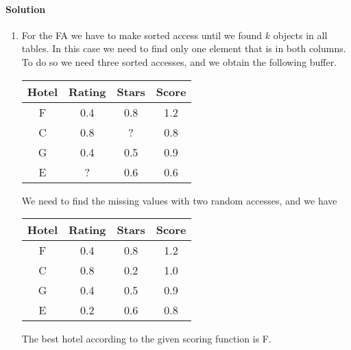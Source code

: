 \paragraph*{Solution}
\begin{enumerate}
    \item For the FA we have to make sorted access until we found $k$ objects in all tables. 
        In this case we need to find only one element that is in both columns. To do so we need 
        three sorted accesses, and we obtain the following buffer. 
        \begin{table}[H]
            \centering
            \begin{tabular}{c|cc|c}
            \hline
            \textbf{Hotel} & \textbf{Rating} & \textbf{Stars} & \textbf{Score} \\ \hline
            F     & 0.4    & 0.8   & 1.2   \\
            C     & 0.8    & ?     & 0.8   \\
            G     & 0.4    & 0.5   & 0.9   \\
            E     & ?      & 0.6   & 0.6   \\ \hline
            \end{tabular}
        \end{table}
        We need to find the missing values with two random accesses, and we have
        \begin{table}[H]
            \centering
            \begin{tabular}{c|cc|c}
            \hline
            \textbf{Hotel} & \textbf{Rating} & \textbf{Stars} & \textbf{Score} \\ \hline
            F     & 0.4    & 0.8   & 1.2   \\
            C     & 0.8    & 0.2   & 1.0   \\
            G     & 0.4    & 0.5   & 0.9   \\
            E     & 0.2    & 0.6   & 0.8   \\ \hline
            \end{tabular}
        \end{table}
        The best hotel according to the given scoring function is F. 


\end{enumerate}
